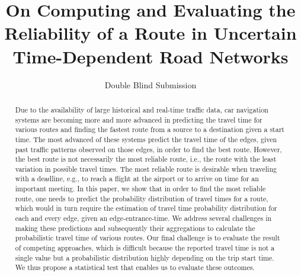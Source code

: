 \documentclass[]{sig-alternate}
\title{On Computing and Evaluating the Reliability of a Route in
Uncertain Time-Dependent Road Networks}
\author{Double Blind Submission}
\begin{document}
\maketitle

%

\begin{abstract}

Due to the availability of large historical and real-time traffic data, car
navigation systems are becoming more and more advanced in predicting the travel
time for various routes and finding the fastest route from a source to a
destination given a start time.  The most advanced of these systems predict the
travel time of the edges, given past traffic patterns observed on those edges,
in order to find the best route. However, the best route is not necessarily the
most reliable route, i.e., the route with the least variation in possible travel times.  The most reliable
route is desirable when traveling with a deadline, e.g., to reach a flight at
the airport or to arrive on time for an important meeting.  In this paper, we
show that in order to find the most reliable route, one needs to predict the
probability distribution of travel times for a route, which would in turn
require the estimation of travel time probability distribution for each and
every edge, given an edge-entrance-time.  We address several challenges in
making these predictions and subsequently their aggregations to calculate the
probabilistic travel time of various routes. Our final challenge is
to evaluate the result of competing approaches, which is difficult because the
reported travel time is not a single value but a probabilistic distribution highly
depending on the trip start time.  We thus propose a statistical test that
enables us to evaluate these outcomes.

\end{abstract}
\end{document}
